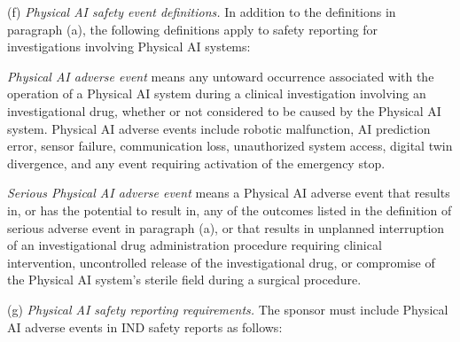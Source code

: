 (f) \textit{Physical AI safety event definitions.} In addition to the definitions in paragraph (a), the following definitions apply to safety reporting for investigations involving Physical AI systems:

\textit{Physical AI adverse event} means any untoward occurrence associated with the operation of a Physical AI system during a clinical investigation involving an investigational drug, whether or not considered to be caused by the Physical AI system. Physical AI adverse events include robotic malfunction, AI prediction error, sensor failure, communication loss, unauthorized system access, digital twin divergence, and any event requiring activation of the emergency stop.

\textit{Serious Physical AI adverse event} means a Physical AI adverse event that results in, or has the potential to result in, any of the outcomes listed in the definition of serious adverse event in paragraph (a), or that results in unplanned interruption of an investigational drug administration procedure requiring clinical intervention, uncontrolled release of the investigational drug, or compromise of the Physical AI system's sterile field during a surgical procedure.

(g) \textit{Physical AI safety reporting requirements.} The sponsor must include Physical AI adverse events in IND safety reports as follows:

